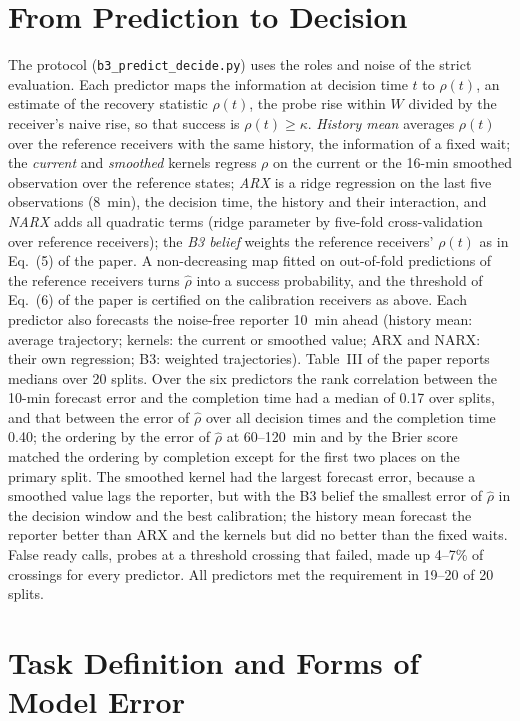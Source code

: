 \documentclass[conference]{IEEEtran}
\begin{document}
\section{From Prediction to Decision}
\label{sec:s-decide}
The protocol (\texttt{b3\_predict\_decide.py}) uses the roles and noise of the strict evaluation. Each predictor maps the information at decision time $t$ to $\hat\rho(t)$, an estimate of the recovery statistic $\rho(t)$, the probe rise within $W$ divided by the receiver's naive rise, so that success is $\rho(t)\geq\kappa$. \emph{History mean} averages $\rho(t)$ over the reference receivers with the same history, the information of a fixed wait; the \emph{current} and \emph{smoothed} kernels regress $\rho$ on the current or the 16-min smoothed observation over the reference states; \emph{ARX} is a ridge regression on the last five observations (8~min), the decision time, the history and their interaction, and \emph{NARX} adds all quadratic terms (ridge parameter by five-fold cross-validation over reference receivers); the \emph{B3 belief} weights the reference receivers' $\rho(t)$ as in Eq.~(5) of the paper. A non-decreasing map fitted on out-of-fold predictions of the reference receivers turns $\hat\rho$ into a success probability, and the threshold of Eq.~(6) of the paper is certified on the calibration receivers as above. Each predictor also forecasts the noise-free reporter 10~min ahead (history mean: average trajectory; kernels: the current or smoothed value; ARX and NARX: their own regression; B3: weighted trajectories). Table~III of the paper reports medians over 20 splits. Over the six predictors the rank correlation between the 10-min forecast error and the completion time had a median of 0.17 over splits, and that between the error of $\hat\rho$ over all decision times and the completion time 0.40; the ordering by the error of $\hat\rho$ at 60--120~min and by the Brier score matched the ordering by completion except for the first two places on the primary split. The smoothed kernel had the largest forecast error, because a smoothed value lags the reporter, but with the B3 belief the smallest error of $\hat\rho$ in the decision window and the best calibration; the history mean forecast the reporter better than ARX and the kernels but did no better than the fixed waits. False ready calls, probes at a threshold crossing that failed, made up 4--7\% of crossings for every predictor. All predictors met the requirement in 19--20 of 20 splits.

\section{Task Definition and Forms of Model Error}
\label{sec:s-scope}
\begin{table}[t]
\caption{Task definition (certified arm, 20 splits), one factor at a time around the baseline $\kappa=0.5$, $W=20$~min, $T_{\rm f}=140$~min ($T_{\rm f}=120+W$ when $W$ varies): splits in which the oracle meets $q$ for both histories, splits in which each rule meets $q$, and median $\Delta T$ of smoothing and the B3 belief against the certified fixed waits (min).}
\label{tab:s-scope-task}
\centering\footnotesize\setlength{\tabcolsep}{2pt}

\end{table}
\end{document}
